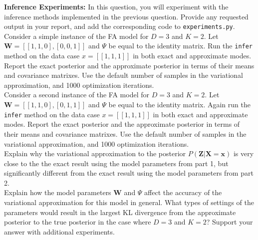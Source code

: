 \documentclass[11pt]{article}
\newcommand{\mbf}[1]{{\mathbf{#1}}}
\begin{document}
\begin{problem}{25} \textbf{Inference Experiments:} In this question, you will experiment with the inference
methods implemented in the previous question. Provide any requested output in your report, and add the corresponding code to \verb|experiments.py|.\\

 Consider a simple instance of the FA model for $D=3$ and $K=2$. Let $\mbf{W}=[[1,1,0],[0,0,1]]$ and $\Psi$
be equal to the identity matrix. Run the \verb|infer| method on the data case $x=[[1,1,1]]$ in both exact and approximate modes. 
Report the exact posterior and the approximate posterior in terms of their means and covariance matrixes. 
Use the default number of samples in the variational approximation, and 1000 optimization iterations.\\

 Consider a second instance of the FA model for $D=3$ and $K=2$. Let $\mbf{W}=[[1,1,0],[0,1,1]]$ and $\Psi$
be equal to the identity matrix. Again run the \verb|infer| method on the data case $x=[[1,1,1]]$ in both exact and approximate modes. 
Report the exact posterior and the approximate posterior in terms of their means and covariance matrixes.
Use the default number of samples in the variational approximation, and 1000 optimization iterations.\\

 Explain why the variational approximation to the posterior $P(\mbf{Z}|\mbf{X}=\mbf{x})$ is very close to the 
the exact result using the model parameters from part 1, but significantly different from the exact result
using the model parameters from part 2.\\

 Explain how the model parameters $\mbf{W}$ and $\Psi$ affect the accuracy of the variational
approximation for this model in general. What types of settings of the parameters would result in the largest KL
divergence from the approximate posterior to the true posterior in the case where $D=3$ and $K=2$?
Support your answer with additional experiments.\\

\end{problem}
\end{document}
